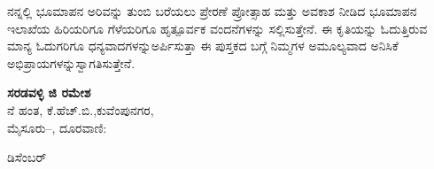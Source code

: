ನನ್ನಲ್ಲಿ ಭೂಮಾಪನ ಅರಿವನ್ನು ತುಂಬಿ ಬರೆಯಲು ಪ್ರೇರಣೆ ಪ್ರೋತ್ಸಾಹ ಮತ್ತು ಅವಕಾಶ ನೀಡಿದ ಭೂಮಾಪನ ಇಲಾಖೆಯ ಹಿರಿಯರಿಗೂ ಗೆಳೆಯರಿಗೂ ಹೃತ್ಪೂರ್ವಕ ವಂದನೆ\-ಗಳನ್ನು ಸಲ್ಲಿಸುತ್ತೇನೆ. ಈ ಕೃತಿಯನ್ನು ಓದುತ್ತಿರುವ ಮಾನ್ಯ ಓದುಗರಿಗೂ ಧನ್ಯವಾದಗಳನ್ನು\break ಅರ್ಪಿಸುತ್ತಾ ಈ ಪುಸ್ತಕದ ಬಗ್ಗೆ ನಿಮ್ಮಗಳ ಅಮೂಲ್ಯವಾದ ಅನಿಸಿಕೆ ಅಭಿಪ್ರಾಯಗಳನ್ನು\break ಸ್ವಾಗತಿಸುತ್ತೇನೆ.

\bigskip

\begin{flushright}
\textbf{ಸರಡವಳ್ಳಿ ಜಿ ರಮೇಶ}\\ನೆ ಹಂತ, ಕೆ.ಹೆಚ್​.ಬಿ.,ಕುವೆಂಪುನಗರ, \\ ಮೈಸೂರು–, ದೂರವಾಣಿ: 
\end{flushright}

\vskip -2.1cm

\noindent
{} ಡಿಸೆಂಬರ್ 

